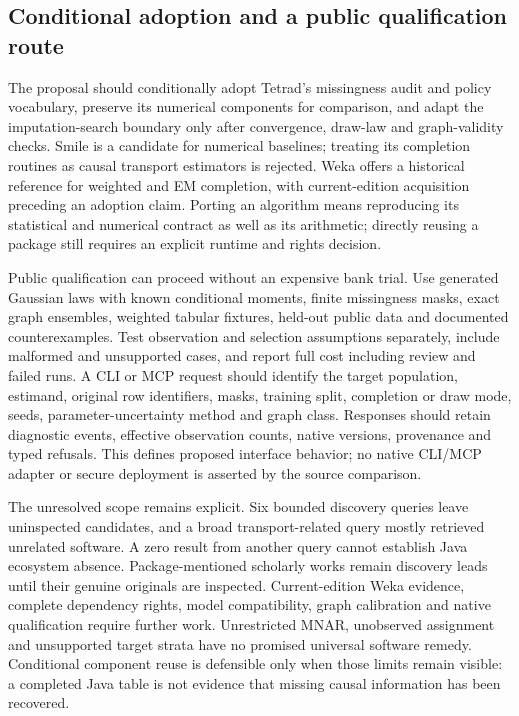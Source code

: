 \subsection*{Conditional adoption and a public qualification route}
The proposal should conditionally adopt Tetrad's missingness audit and policy vocabulary, preserve its numerical components for comparison, and adapt the imputation-search boundary only after convergence, draw-law and graph-validity checks. Smile is a candidate for numerical baselines; treating its completion routines as causal transport estimators is rejected. Weka offers a historical reference for weighted and EM completion, with current-edition acquisition preceding an adoption claim. Porting an algorithm means reproducing its statistical and numerical contract as well as its arithmetic; directly reusing a package still requires an explicit runtime and rights decision.\citep{exec25_jtm_choice}

Public qualification can proceed without an expensive bank trial. Use generated Gaussian laws with known conditional moments, finite missingness masks, exact graph ensembles, weighted tabular fixtures, held-out public data and documented counterexamples. Test observation and selection assumptions separately, include malformed and unsupported cases, and report full cost including review and failed runs. A CLI or MCP request should identify the target population, estimand, original row identifiers, masks, training split, completion or draw mode, seeds, parameter-uncertainty method and graph class. Responses should retain diagnostic events, effective observation counts, native versions, provenance and typed refusals. This defines proposed interface behavior; no native CLI/MCP adapter or secure deployment is asserted by the source comparison.\citep{exec25_jtm_choice}

The unresolved scope remains explicit. Six bounded discovery queries leave uninspected candidates, and a broad transport-related query mostly retrieved unrelated software. A zero result from another query cannot establish Java ecosystem absence. Package-mentioned scholarly works remain discovery leads until their genuine originals are inspected. Current-edition Weka evidence, complete dependency rights, model compatibility, graph calibration and native qualification require further work. Unrestricted MNAR, unobserved assignment and unsupported target strata have no promised universal software remedy. Conditional component reuse is defensible only when those limits remain visible: a completed Java table is not evidence that missing causal information has been recovered.\citep{exec25_jtm_choice}
